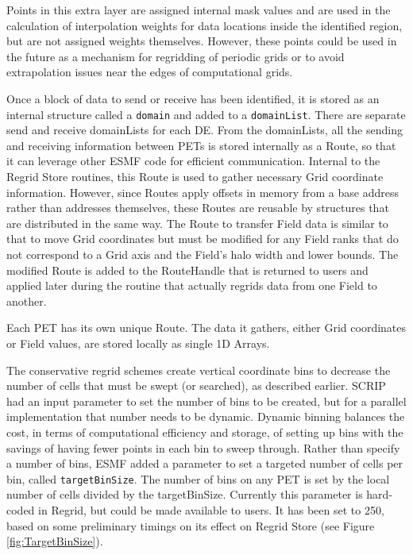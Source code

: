 Points in this extra layer are assigned internal mask values and are used in the
calculation of interpolation weights for data locations inside the identified
region, but are not assigned weights themselves.  However, these points could be
used in the future as a mechanism for regridding of periodic grids or to avoid
extrapolation issues near the edges of computational grids.

Once a block of data to send or receive has been identified, it is stored as an
internal structure called a {\tt domain} and added to a {\tt domainList}.  There
are separate send and receive domainLists for each DE.  From the domainLists,
all the sending and receiving information between PETs is stored internally as a
Route, so that it can leverage other ESMF code for efficient communication.
Internal to the Regrid Store routines, this Route is used to gather necessary
Grid coordinate information.  However, since Routes apply offsets in memory from
a base address rather than addresses themselves, these Routes are reusable by
structures that are distributed in the same way.  The Route to transfer Field
data is similar to that to move Grid coordinates but must be modified for any
Field ranks that do not correspond to a Grid axis and the Field's halo width and
lower bounds.   The modified Route is added to the RouteHandle that is returned
to users and applied later during the routine that actually regrids data from
one Field to another.

Each PET has its own unique Route.  The data it gathers, either Grid coordinates
or Field values, are stored locally as single 1D Arrays.


The conservative regrid schemes create vertical coordinate bins to decrease the
number of cells that must be swept (or searched), as described earlier.  SCRIP
had an input parameter to set the number of bins to be created, but for a
parallel implementation that number needs to be dynamic.  Dynamic binning
balances the cost, in terms of computational efficiency and storage, of setting
up bins with the savings of having fewer points in each bin to sweep through.  
Rather than specify a number of bins, ESMF added a parameter to set a targeted
number of cells per bin, called {\tt targetBinSize}.  The number of bins on any
PET is set by the local number of cells divided by the targetBinSize.  Currently
this parameter is hard-coded in Regrid, but could be made available to users.
It has been set to 250, based on some preliminary timings on its effect on
Regrid Store (see Figure \ref{fig:TargetBinSize}).

